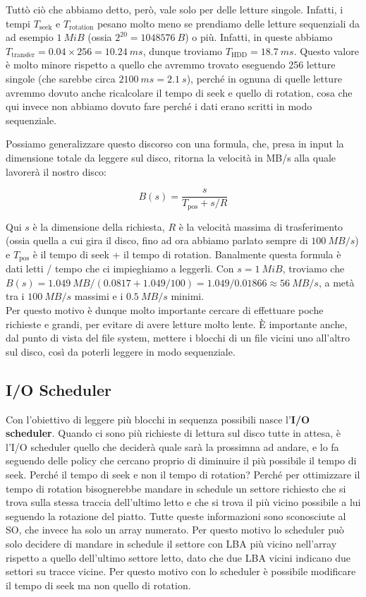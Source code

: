 \documentclass[11pt, a4paper, titlepage, oneside]{scrbook}
\begin{document}
Tuttò ciò che abbiamo detto, però, vale solo per delle letture singole. Infatti, i tempi $T_{\text{seek}}$ e $T_{\text{rotation}}$ pesano molto meno se prendiamo delle letture sequenziali da ad esempio $\SI{1}{MiB}$ (ossia $2^{20} = \SI{1048576}{B}$) o più. Infatti, in queste abbiamo $T_{\text{transfer}} = 0.04 \times 256 = \SI{10.24}{ms}$, dunque troviamo $T_{\text{HDD}} = \SI{18.7}{ms}$. Questo valore è molto minore rispetto a quello che avremmo trovato eseguendo 256 letture singole (che sarebbe circa $\SI{2100}{ms} = \SI{2.1}{s}$), perché in ognuna di quelle letture avremmo dovuto anche ricalcolare il tempo di seek e quello di rotation, cosa che qui invece non abbiamo dovuto fare perché i dati erano scritti in modo sequenziale.

Possiamo generalizzare questo discorso con una formula, che, presa in input la dimensione totale da leggere sul disco, ritorna la velocità in MB/s alla quale lavorerà il nostro disco:

\[
B(s) = \frac{s}{T_{\text{pos}} + s/R}
\]

Qui $s$ è la dimensione della richiesta, $R$ è la velocità massima di trasferimento (ossia quella a cui gira il disco, fino ad ora abbiamo parlato sempre di $\SI{100}{MB/s}$) e $T_{\text{pos}}$ è il tempo di seek + il tempo di rotation. Banalmente questa formula è dati letti / tempo che ci impieghiamo a leggerli. Con $s = \SI{1}{MiB}$, troviamo che $B(s) = \SI{1.049}{MB} / (0.0817 + 1.049/100) = 1.049 / 0.01866 \approx \SI{56}{MB/s}$, a metà tra i $\SI{100}{MB/s}$ massimi e i $\SI{0.5}{MB/s}$ minimi. \\
Per questo motivo è dunque molto importante cercare di effettuare poche richieste e grandi, per evitare di avere letture molto lente. È importante anche, dal punto di vista del file system, mettere i blocchi di un file vicini uno all'altro sul disco, così da poterli leggere in modo sequenziale. 

\subsection{I/O Scheduler}

Con l'obiettivo di leggere più blocchi in sequenza possibili nasce l'\textbf{I/O scheduler}. Quando ci sono più richieste di lettura sul disco tutte in attesa, è l'I/O scheduler quello che deciderà quale sarà la prossimna ad andare, e lo fa seguendo delle policy che cercano proprio di diminuire il più possibile il tempo di seek. Perché il tempo di seek e non il tempo di rotation? Perché per ottimizzare il tempo di rotation bisognerebbe mandare in schedule un settore richiesto che si trova sulla stessa traccia dell'ultimo letto e che si trova il più vicino possibile a lui seguendo la rotazione del piatto. Tutte queste informazioni sono sconosciute al SO, che invece ha solo un array numerato. Per questo motivo lo scheduler può solo decidere di mandare in schedule il settore con LBA più vicino nell'array rispetto a quello dell'ultimo settore letto, dato che due LBA vicini indicano due settori su tracce vicine. Per questo motivo con lo scheduler è possibile modificare il tempo di seek ma non quello di rotation. 
\end{document}
